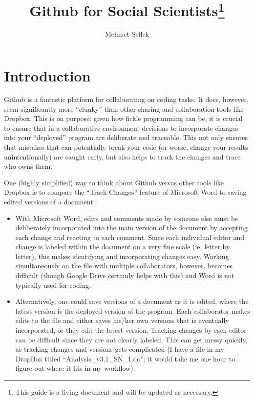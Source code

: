 \documentclass[11pt, oneside]{article}   	%
\title{Github for Social Scientists\footnote{This guide is a living document and will be updated as necessary.}}
\author{Mehmet Seflek}
\begin{document}
\maketitle

\section{Introduction}

Github is a fantastic platform for collaborating on coding tasks. It does, however, seem significantly more ``clunky'' than other sharing and collaboration tools like Dropbox. This is on purpose: given how fickle programming can be, it is crucial to ensure that in a collaborative environment decisions to incorporate changes into your ``deployed'' program are deliberate and traceable. This not only ensures that mistakes that can potentially break your code (or worse, change your results unintentionally) are caught early, but also helps to track the changes and trace who owns them.

One (highly simplified) way to think about Github versus other tools like Dropbox is to compare the ``Track Changes'' feature of Microsoft Word to saving edited versions of a document:
\begin{itemize}
 \item With Microsoft Word, edits and comments made by someone else must be deliberately incorporated into the main version of the document by accepting each change and reacting to each comment. Since each individual editor and change is labeled within the document on a very fine scale (ie. letter by letter), this makes identifying and incorporating changes easy. Working simultaneously on the file with multiple collaborators, however, becomes difficult (though Google Drive certainly helps with this) and Word is not typically used for coding.
 \item Alternatively, one could save versions of a document as it is edited, where the latest version is the deployed version of the program. Each collaborator makes edits to the file and either saves his/her own versions that is eventually incorporated, or they edit the latest version. Tracking changes by each editor can be difficult since they are not clearly labeled. This can get messy quickly, as tracking changes and versions gets complicated (I have a file in my DropBox titled ``Analysis\_v3.1\_SN\_1.do''; it would take me one hour to figure out where it fits in my workflow).
 \end{itemize}
\end{document}
